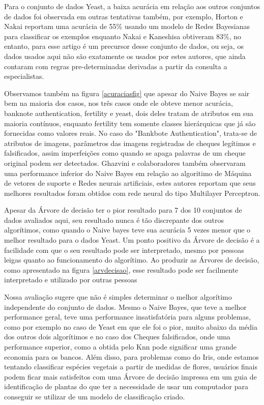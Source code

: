 \documentclass[12pt, a4paper]{article}
\begin{document}
\begin{table}[!ht]
\begin{tabular}{|l|l|l|l|}
\hline
\end{tabular}

\end{table}

Para o conjunto de dados Yeast, a baixa acurácia em relação aos outros conjuntos de dados foi observada em outras tentativas também, por exemplo, Horton e Nakai \citep{horton_kenta1996} reportam uma acurácia de 55\% usando um modelo de Redes Bayesianas para classificar os exemplos enquanto Nakai e Kaneshisa \citep{nakai_kaneshisa1991} obtiveram 83\%, no entanto, para esse artigo é um precursor desse conjunto de dados, ou seja, os dados usados aqui não são exatamente os usados por estes autores, que ainda contaram com regras pre-determinadas derivadas a partir da consulta a especialistas. 

Observamos também na figura \ref{acuraciasfig} que apesar do Naive Bayes se sair bem na maioria dos casos, nos três casos onde ele obteve menor acurácia, banknote authentication, fertility e yeast, dois deles tratam de atributos em sua maioria contínuos, enquanto fertility tem somente classes hierárquicas que já são fornecidas como valores reais. No caso do "Bankbote Authentication", trata-se de atributos de imagens, parâmetros das imagens registradas de cheques legítimos e falsificados, assim imperfeições como quando se apaga palavras de um cheque original podem ser detectados. Ghazvini e colaboradores \citep{ghazvini_etal2014} também observaram uma performance inferior do Naive Bayes em relação ao algoritimo de Máquina de vetores de suporte e Redes neurais artificiais, estes autores reportam que seus melhores resultados foram obtidos com rede neural do tipo Multilayer Perceptron.

Apesar da Árvore de decisão ter o pior resultado para 7 dos 10 conjuntos de dados avaliados aqui, seu resultado nunca é tão discrepante dos outros algorítimos, como quando o Naive bayes teve sua acurácia 5 vezes menor que o melhor resultado para o dados Yeast. Um ponto positivo da Árvore de decisão é a facilidade com que o seu resultado pode ser interpretado, mesmo por pessoas leigas quanto ao funcionamento do algorítimo. Ao produzir as Árvores de decisão, como apresentado na figura \ref{arvdecisao}, esse resultado pode ser facilmente interpretado e utilizado por outras pessoas \citep{berzal_etal2003}

Nossa avaliação sugere que não é simples determinar o melhor algorítimo independente do conjunto de dados. Mesmo o Naive Bayes, que teve a melhor performance geral, teve uma performance insatisfatória para alguns problemas, como por exemplo no caso de Yeast em que ele foi o pior, muito abaixo da média dos outros dois algorítimos e no caso dos Cheques falsificados, onde uma performance superior, como a obtida pelo Knn pode significar uma grande economia para os bancos. Além disso, para problemas como do Iris, onde estamos tentando classificar espécies vegetais a partir de medidas de flores, usuários finais podem ficar mais satisfeitos com uma Árvore de decisão impressa em um guia de identificação de plantas do que ter a necessidade de usar um computador para conseguir se utilizar de um modelo de classificação criado.
\end{document}
